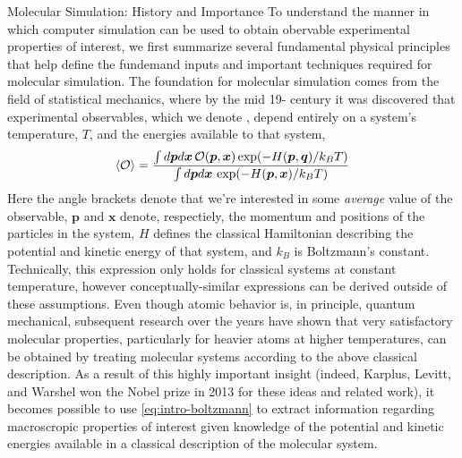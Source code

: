 \begin{section}{Molecular Simulation: History and Importance}
To understand the manner in which computer simulation can be used to obtain obervable experimental properties
of interest,\footnotemark{} we first summarize several fundamental
physical principles
that help define the
fundemand inputs and important techniques required for molecular simulation.
The foundation for molecular simulation comes from the field of
statistical mechanics, where by the mid 19- century it was discovered
that experimental observables, which we denote \obs, depend entirely on
a system's temperature, $T$, and the energies available to that system,
%
\begin{align}
\label{eq:intro-boltzmann}
\braket{\mathcal{O}} = 
\frac{\int d\bm p d\bm x \, \mathcal{O}(\bm p, \bm x) \exp (-H(\bm p, \bm q)/k_BT)}
{\int  d\bm p d\bm x \, \exp (-H(\bm p, \bm x)/k_BT) }
\end{align}
%
Here the angle brackets denote that we're interested in some \emph{average}
value of the observable, $\bm p$ and $\bm x$ denote, respectiely, the momentum
and positions of the particles in the system, 
$H$ defines the classical Hamiltonian describing the potential and kinetic
energy of that system,
and $k_B$ is Boltzmann's constant.\cite{allen1989computer}
Technically,
this expression only holds for classical systems at constant temperature,
however conceptually-similar expressions can be derived outside of these
assumptions. 
Even though atomic behavior is, in principle, quantum mechanical,
subsequent research over the years have shown that
very satisfactory molecular properties, particularly for heavier atoms at higher
temperatures,
\cite{Karplus2014}
can be obtained by treating molecular systems according to the above classical
description.
As a result of this highly important insight (indeed, Karplus, Levitt, and
Warshel won the Nobel prize in 2013 for these ideas and related
work),\cite{Karplus2014} it becomes possible to use
\cref{eq:intro-boltzmann} to
extract information regarding macroscropic properties of
interest 
given knowledge of the potential and kinetic energies available in a classical
description of the molecular system. 



\end{section}
